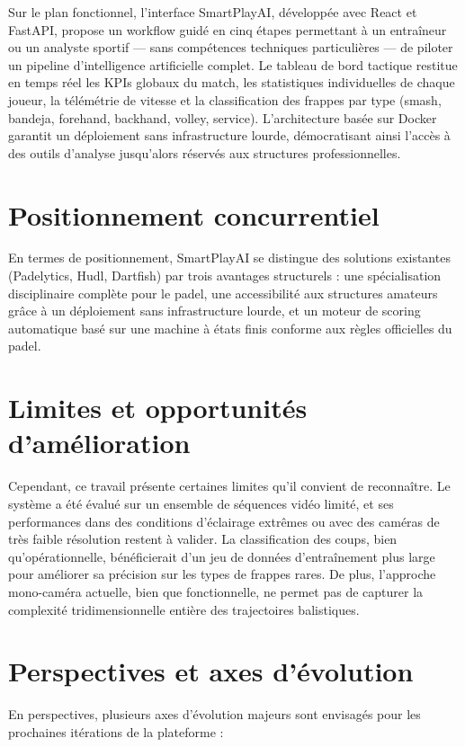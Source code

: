 Sur le plan fonctionnel, l'interface SmartPlayAI, développée avec React et FastAPI, propose un workflow guidé en cinq étapes permettant à un entraîneur ou un analyste sportif — sans compétences techniques particulières — de piloter un pipeline d'intelligence artificielle complet. Le tableau de bord tactique restitue en temps réel les KPIs globaux du match, les statistiques individuelles de chaque joueur, la télémétrie de vitesse et la classification des frappes par type (smash, bandeja, forehand, backhand, volley, service). L'architecture basée sur Docker garantit un déploiement sans infrastructure lourde, démocratisant ainsi l'accès à des outils d'analyse jusqu'alors réservés aux structures professionnelles.

\section*{Positionnement concurrentiel}

En termes de positionnement, SmartPlayAI se distingue des solutions existantes (Padelytics, Hudl, Dartfish) par trois avantages structurels : une spécialisation disciplinaire complète pour le padel, une accessibilité aux structures amateurs grâce à un déploiement sans infrastructure lourde, et un moteur de scoring automatique basé sur une machine à états finis conforme aux règles officielles du padel.

\section*{Limites et opportunités d'amélioration}

Cependant, ce travail présente certaines limites qu'il convient de reconnaître. Le système a été évalué sur un ensemble de séquences vidéo limité, et ses performances dans des conditions d'éclairage extrêmes ou avec des caméras de très faible résolution restent à valider. La classification des coups, bien qu'opérationnelle, bénéficierait d'un jeu de données d'entraînement plus large pour améliorer sa précision sur les types de frappes rares. De plus, l'approche mono-caméra actuelle, bien que fonctionnelle, ne permet pas de capturer la complexité tridimensionnelle entière des trajectoires balistiques.

\section*{Perspectives et axes d'évolution}

En perspectives, plusieurs axes d'évolution majeurs sont envisagés pour les prochaines itérations de la plateforme :


